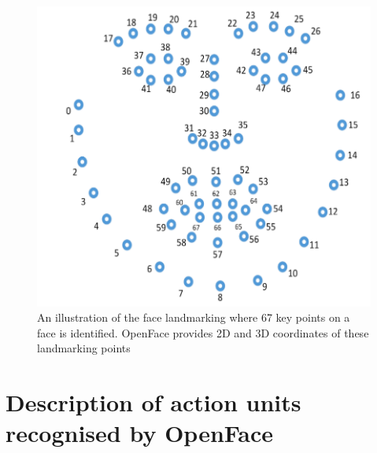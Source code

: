 \documentclass{monashthesis}
\begin{document}
\begin{figure}

{\centering \includegraphics[width=1\linewidth]{figures/landmarking} 

}

\caption{An illustration of the face landmarking where 67 key points on a face is identified. OpenFace provides 2D and 3D coordinates of these landmarking points}\label{fig:landmarking}
\end{figure}

\hypertarget{description-of-action-units-recognised-by-openface}{%
\section{Description of action units recognised by OpenFace}\label{description-of-action-units-recognised-by-openface}}
\end{document}

